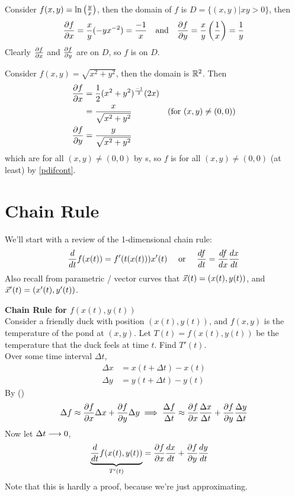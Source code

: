 \documentclass[english, 11pt]{article}
\begin{document}
\begin{exmp}
  Consider $f(x,y) = \ln \left( \frac{y}{x} \right)$, then the domain of $f$ is $D = \{ (x,y) | xy>0 \}$, then
  \[ \frac{\partial f}{\partial x} = \frac{x}{y} (-yx^{-2}) = \frac{-1}{x} \mbox{ \ \ and \ \ } \frac{\partial f}{\partial y} = \frac{x}{y}  \left( \frac{1}{x} \right) = \frac{1}{y} \]
  Clearly $\frac{\partial f}{\partial x}$ and $\frac{\partial f}{\partial y}$ are  on $D$, so $f$ is  on $D$.
\end{exmp}

\begin{exmp}
  Consider $f(x,y) = \sqrt{x^2 + y^2}$, then the domain is ${\mathbb{R}}^2$. Then
  \begin{align*}
    \frac{\partial f}{\partial x} & = \frac{1}{2}(x^2+y^2)^{\frac{-1}{2}}(2x) \\
    & = \frac{x}{\sqrt{x^2 + y^2}} & \mbox{(for $(x,y) \not = (0,0)$)}\\
    \frac{\partial f}{\partial y} & = \frac{y}{\sqrt{x^2 + y^2}}
  \end{align*}
  which are  for all $(x,y) \not = (0,0)$ by s, so $f$ is  for all $(x,y) \not = (0,0)$ (at least) by \autoref{pdifcont}.
\end{exmp}

\section{Chain Rule}

We'll start with a review of the 1-dimensional chain rule:
\[ \f{d}{dt} f(x(t)) = f'(t(x(t))) x'(t) \mbox{\ \ \ \ or \ \ \ } \f{df}{dt} = \f{df}{dx} \f{dx}{dt} \]
Also recall from parametric / vector curves that $\vec{x}(t) = (x(t), y(t))$, and $\vec{x}'(t) = (x'(t), y'(t))$.

\textbf{Chain Rule for $f(x(t), y(t))$} \\

Consider a friendly duck with position $(x(t), y(t))$, and $f(x,y)$ is the temperature of the pond at $(x,y)$. Let $T(t) = f(x(t),y(t))$ be the temperature that the duck feels at time $t$. Find $T'(t)$. \\

Over some time interval $\Delta t$,
\begin{align*}
  \Delta x & = x (t + \Delta t) - x(t) \\
  \Delta y & = y(t + \Delta t) - y(t)
\end{align*}
By  ()
\begin{align*}
  \Delta f \approx \frac{\partial f}{\partial x} \Delta x + \frac{\partial f}{\partial y} \Delta y \implies \frac{\Delta f}{\Delta t} \approx \frac{\partial f}{\partial x} \frac{\Delta x}{\Delta t} + \frac{\partial f}{\partial y} \frac{\Delta y}{\Delta t}
\end{align*}
Now let $\Delta t \longrightarrow 0$,
\begin{align*}
  \ub{\f{d}{dt} f(x(t), y(t))}_{T'(t)} & \stackrel{\textcolor{light-gray}{?}}{=} \pfx \f{dx}{dt} + \pfy \f{dy}{dt}
\end{align*}
Note that this is hardly a proof, because we're just approximating.
\end{document}
